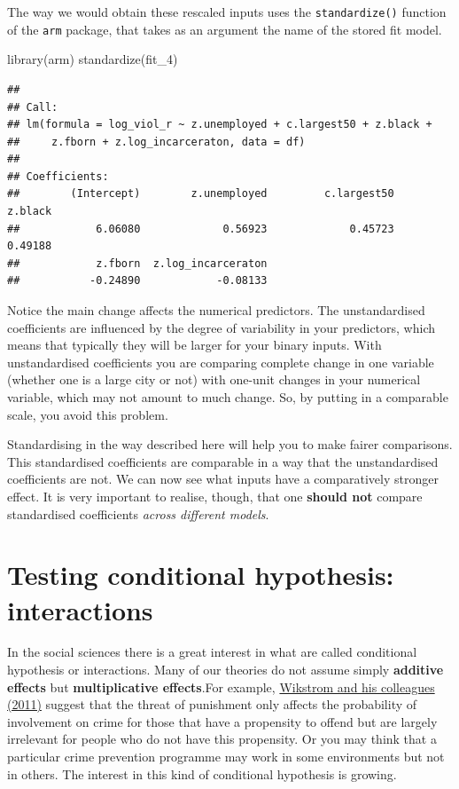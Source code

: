 \documentclass[
]{book}
\newenvironment{Shaded}{\begin{snugshade}}{\end{snugshade}}
\newcommand{\FunctionTok}[1]{\textcolor[rgb]{0.00,0.00,0.00}{#1}}
\newcommand{\NormalTok}[1]{#1}
\begin{document}
The way we would obtain these rescaled inputs uses the \texttt{standardize()} function of the \texttt{arm} package, that takes as an argument the name of the stored fit model.

\begin{Shaded}
\begin{Highlighting}[]
\FunctionTok{library}\NormalTok{(arm)}
\FunctionTok{standardize}\NormalTok{(fit\_4)}
\end{Highlighting}
\end{Shaded}

\begin{verbatim}
## 
## Call:
## lm(formula = log_viol_r ~ z.unemployed + c.largest50 + z.black + 
##     z.fborn + z.log_incarceraton, data = df)
## 
## Coefficients:
##        (Intercept)        z.unemployed         c.largest50             z.black  
##            6.06080             0.56923             0.45723             0.49188  
##            z.fborn  z.log_incarceraton  
##           -0.24890            -0.08133
\end{verbatim}

Notice the main change affects the numerical predictors. The unstandardised coefficients are influenced by the degree of variability in your predictors, which means that typically they will be larger for your binary inputs. With unstandardised coefficients you are comparing complete change in one variable (whether one is a large city or not) with one-unit changes in your numerical variable, which may not amount to much change. So, by putting in a comparable scale, you avoid this problem.

Standardising in the way described here will help you to make fairer comparisons. This standardised coefficients are comparable in a way that the unstandardised coefficients are not. We can now see what inputs have a comparatively stronger effect. It is very important to realise, though, that one \textbf{should not} compare standardised coefficients \emph{across different models}.

\hypertarget{testing-conditional-hypothesis-interactions}{%
\section{Testing conditional hypothesis: interactions}\label{testing-conditional-hypothesis-interactions}}

In the social sciences there is a great interest in what are called conditional hypothesis or interactions. Many of our theories do not assume simply \textbf{additive effects} but \textbf{multiplicative effects}.For example, \href{http://euc.sagepub.com/content/8/5/401.short}{Wikstrom and his colleagues (2011)} suggest that the threat of punishment only affects the probability of involvement on crime for those that have a propensity to offend but are largely irrelevant for people who do not have this propensity. Or you may think that a particular crime prevention programme may work in some environments but not in others. The interest in this kind of conditional hypothesis is growing.
\end{document}
